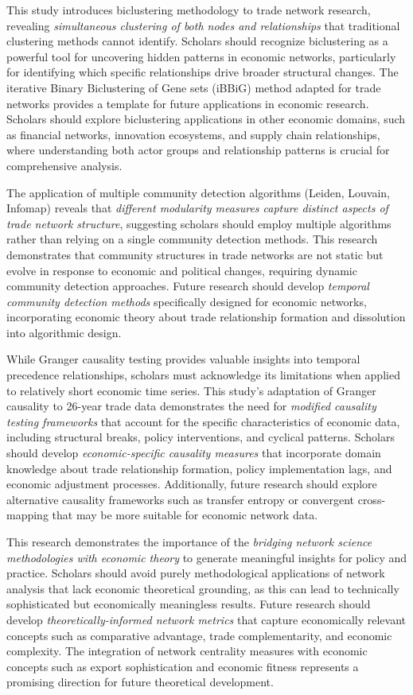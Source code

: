 \documentclass[preprint, 3p,
authoryear]{elsarticle} %
\begin{document}
This study introduces biclustering methodology to trade network
research, revealing \emph{simultaneous clustering of both nodes and
relationships} that traditional clustering methods cannot identify.
Scholars should recognize biclustering as a powerful tool for uncovering
hidden patterns in economic networks, particularly for identifying which
specific relationships drive broader structural changes. The iterative
Binary Biclustering of Gene sets (iBBiG) method adapted for trade
networks provides a template for future applications in economic
research. Scholars should explore biclustering applications in other
economic domains, such as financial networks, innovation ecosystems, and
supply chain relationships, where understanding both actor groups and
relationship patterns is crucial for comprehensive analysis.

The application of multiple community detection algorithms (Leiden,
Louvain, Infomap) reveals that \emph{different modularity measures
capture distinct aspects of trade network structure}, suggesting
scholars should employ multiple algorithms rather than relying on a
single community detection methods. This research demonstrates that
community structures in trade networks are not static but evolve in
response to economic and political changes, requiring dynamic community
detection approaches. Future research should develop \emph{temporal
community detection methods} specifically designed for economic
networks, incorporating economic theory about trade relationship
formation and dissolution into algorithmic design.

While Granger causality testing provides valuable insights into temporal
precedence relationships, scholars must acknowledge its limitations when
applied to relatively short economic time series. This study's
adaptation of Granger causality to 26-year trade data demonstrates the
need for \emph{modified causality testing frameworks} that account for
the specific characteristics of economic data, including structural
breaks, policy interventions, and cyclical patterns. Scholars should
develop \emph{economic-specific causality measures} that incorporate
domain knowledge about trade relationship formation, policy
implementation lags, and economic adjustment processes. Additionally,
future research should explore alternative causality frameworks such as
transfer entropy or convergent cross-mapping that may be more suitable
for economic network data.

This research demonstrates the importance of the \emph{bridging network
science methodologies with economic theory} to generate meaningful
insights for policy and practice. Scholars should avoid purely
methodological applications of network analysis that lack economic
theoretical grounding, as this can lead to technically sophisticated but
economically meaningless results. Future research should develop
\emph{theoretically-informed network metrics} that capture economically
relevant concepts such as comparative advantage, trade complementarity,
and economic complexity. The integration of network centrality measures
with economic concepts such as export sophistication and economic
fitness represents a promising direction for future theoretical
development.
\end{document}
